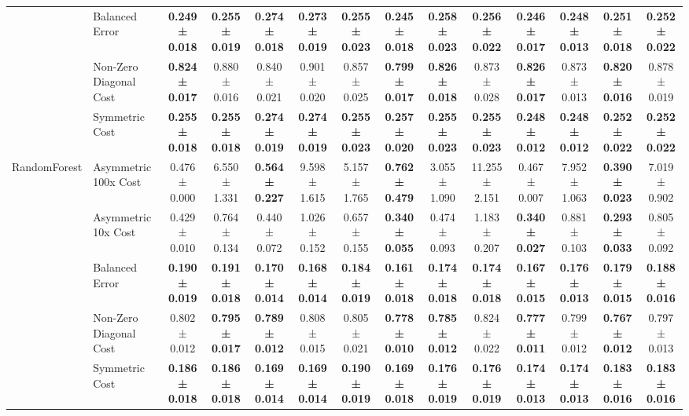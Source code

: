 \begin{table}[H]
{\begin{tabular}{llcccccccccccc}
 & Balanced Error & \textbf{0.249 ± 0.018} & \textbf{0.255 ± 0.019} & \textbf{0.274 ± 0.018} & \textbf{0.273 ± 0.019} & \textbf{0.255 ± 0.023} & \textbf{0.245 ± 0.018} & \textbf{0.258 ± 0.023} & \textbf{0.256 ± 0.022} & \textbf{0.246 ± 0.017} & \textbf{0.248 ± 0.013} & \textbf{0.251 ± 0.018} & \textbf{0.252 ± 0.022} \\
 & Non-Zero Diagonal Cost & \textbf{0.824 ± 0.017} & 0.880 ± 0.016 & 0.840 ± 0.021 & 0.901 ± 0.020 & 0.857 ± 0.025 & \textbf{0.799 ± 0.017} & \textbf{0.826 ± 0.018} & 0.873 ± 0.028 & \textbf{0.826 ± 0.017} & 0.873 ± 0.013 & \textbf{0.820 ± 0.016} & 0.878 ± 0.019 \\
 & Symmetric Cost & \textbf{0.255 ± 0.018} & \textbf{0.255 ± 0.018} & \textbf{0.274 ± 0.019} & \textbf{0.274 ± 0.019} & \textbf{0.255 ± 0.023} & \textbf{0.257 ± 0.020} & \textbf{0.255 ± 0.023} & \textbf{0.255 ± 0.023} & \textbf{0.248 ± 0.012} & \textbf{0.248 ± 0.012} & \textbf{0.252 ± 0.022} & \textbf{0.252 ± 0.022} \\
\cline{1-14}
\multirow[t]{5}{*}{RandomForest} & Asymmetric 100x Cost & 0.476 ± 0.000 & 6.550 ± 1.331 & \textbf{0.564 ± 0.227} & 9.598 ± 1.615 & 5.157 ± 1.765 & \textbf{0.762 ± 0.479} & 3.055 ± 1.090 & 11.255 ± 2.151 & 0.467 ± 0.007 & 7.952 ± 1.063 & \textbf{0.390 ± 0.023} & 7.019 ± 0.902 \\
 & Asymmetric 10x Cost & 0.429 ± 0.010 & 0.764 ± 0.134 & 0.440 ± 0.072 & 1.026 ± 0.152 & 0.657 ± 0.155 & \textbf{0.340 ± 0.055} & 0.474 ± 0.093 & 1.183 ± 0.207 & \textbf{0.340 ± 0.027} & 0.881 ± 0.103 & \textbf{0.293 ± 0.033} & 0.805 ± 0.092 \\
 & Balanced Error & \textbf{0.190 ± 0.019} & \textbf{0.191 ± 0.018} & \textbf{0.170 ± 0.014} & \textbf{0.168 ± 0.014} & \textbf{0.184 ± 0.019} & \textbf{0.161 ± 0.018} & \textbf{0.174 ± 0.018} & \textbf{0.174 ± 0.018} & \textbf{0.167 ± 0.015} & \textbf{0.176 ± 0.013} & \textbf{0.179 ± 0.015} & \textbf{0.188 ± 0.016} \\
 & Non-Zero Diagonal Cost & 0.802 ± 0.012 & \textbf{0.795 ± 0.017} & \textbf{0.789 ± 0.012} & 0.808 ± 0.015 & 0.805 ± 0.021 & \textbf{0.778 ± 0.010} & \textbf{0.785 ± 0.012} & 0.824 ± 0.022 & \textbf{0.777 ± 0.011} & 0.799 ± 0.012 & \textbf{0.767 ± 0.012} & 0.797 ± 0.013 \\
 & Symmetric Cost & \textbf{0.186 ± 0.018} & \textbf{0.186 ± 0.018} & \textbf{0.169 ± 0.014} & \textbf{0.169 ± 0.014} & \textbf{0.190 ± 0.019} & \textbf{0.169 ± 0.018} & \textbf{0.176 ± 0.019} & \textbf{0.176 ± 0.019} & \textbf{0.174 ± 0.013} & \textbf{0.174 ± 0.013} & \textbf{0.183 ± 0.016} & \textbf{0.183 ± 0.016} \\

\end{tabular}}
\end{table}

